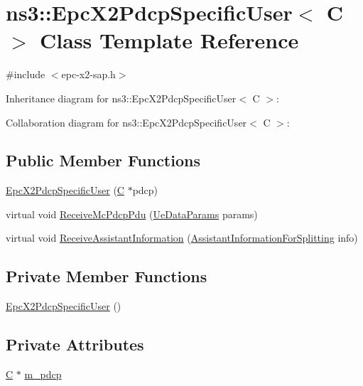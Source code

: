 \hypertarget{classns3_1_1EpcX2PdcpSpecificUser}{}\section{ns3\+:\+:Epc\+X2\+Pdcp\+Specific\+User$<$ C $>$ Class Template Reference}
\label{classns3_1_1EpcX2PdcpSpecificUser}


{\ttfamily \#include $<$epc-\/x2-\/sap.\+h$>$}



Inheritance diagram for ns3\+:\+:Epc\+X2\+Pdcp\+Specific\+User$<$ C $>$\+:


Collaboration diagram for ns3\+:\+:Epc\+X2\+Pdcp\+Specific\+User$<$ C $>$\+:
\subsection*{Public Member Functions}
\begin{DoxyCompactItemize}
\item 
\hyperlink{classns3_1_1EpcX2PdcpSpecificUser_a09bed1cb4ae47f4ef878b8f76045e72f}{Epc\+X2\+Pdcp\+Specific\+User} (\hyperlink{loss__COST231__small__cities__urban_8m_aaa53ca0b650dfd85c4f59fa156f7a2cc}{C} $\ast$pdcp)
\item 
virtual void \hyperlink{classns3_1_1EpcX2PdcpSpecificUser_aeaa4cecdda7807c4fb12f094650b3dec}{Receive\+Mc\+Pdcp\+Pdu} (\hyperlink{structns3_1_1EpcX2Sap_1_1UeDataParams}{Ue\+Data\+Params} params)
\item 
virtual void \hyperlink{classns3_1_1EpcX2PdcpSpecificUser_a17660bb67ba6f01dedd359a38054a3ea}{Receive\+Assistant\+Information} (\hyperlink{structns3_1_1EpcX2Sap_1_1AssistantInformationForSplitting}{Assistant\+Information\+For\+Splitting} info)
\end{DoxyCompactItemize}
\subsection*{Private Member Functions}
\begin{DoxyCompactItemize}
\item 
\hyperlink{classns3_1_1EpcX2PdcpSpecificUser_a13316d8e0b57e7d7ee1a7a6bf2dabc6f}{Epc\+X2\+Pdcp\+Specific\+User} ()
\end{DoxyCompactItemize}
\subsection*{Private Attributes}
\begin{DoxyCompactItemize}
\item 
\hyperlink{loss__COST231__small__cities__urban_8m_aaa53ca0b650dfd85c4f59fa156f7a2cc}{C} $\ast$ \hyperlink{classns3_1_1EpcX2PdcpSpecificUser_abf1849d023d72b8f8d131f0ebd54770a}{m\+\_\+pdcp}
\end{DoxyCompactItemize}
